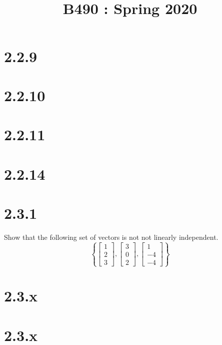 \documentclass[11pt]{article}
\title{
    \vspace{2in}
    \textmd{\textbf{\tit}}\\
    \normalsize\vspace{0.1in}\small{B490 : Spring 2020 }\\
    \vspace{0.1in}\large{\textit{\auths}}
    \vspace{3in}
}
\date{}
\begin{document}
\maketitle
\pagebreak




\section{2.2.9}

\section{2.2.10}

\section{2.2.11}

\section{2.2.14}

\section{2.3.1} Show that the following set of vectors is not not linearly independent.
\[
\left\{
\begin{bmatrix} 1 \\ 2 \\ 3 \end{bmatrix},
\begin{bmatrix} 3 \\ 0 \\ 2 \end{bmatrix},
\begin{bmatrix} 1 \\ -4 \\ -4 \end{bmatrix}
\right\}
\]

\section{2.3.x}
\section{2.3.x}
\end{document}
